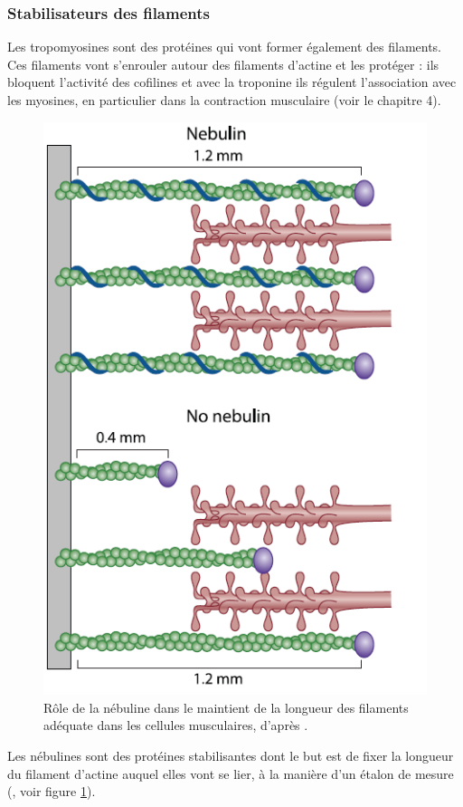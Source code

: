 \subsubsection{Stabilisateurs des filaments}

Les tropomyosines sont des protéines qui vont former également des filaments. Ces filaments vont s'enrouler autour des filaments d'actine et les protéger : ils bloquent l'activité des cofilines et avec la troponine ils régulent l'association avec les myosines, en particulier dans la contraction musculaire (voir le chapitre 4).

\begin{figure}
\includegraphics[scale=0.4]{Figures/Nebuline.png} 
\caption{Rôle de la nébuline dans le maintient de la longueur des filaments adéquate dans les cellules musculaires, d'après \cite{ottenheijm_lifting_2010}.\label{nebuline}}
\end{figure} 

Les nébulines sont des protéines stabilisantes dont le but est de fixer la longueur du filament d'actine auquel elles vont se lier, à la manière d'un étalon de mesure (\cite{ottenheijm_lifting_2010}, voir figure \ref{nebuline}). 



